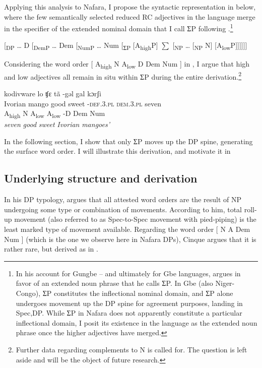 \documentclass[output=paper]{langscibook}
\begin{document}
Applying this analysis to Nafara, I propose the syntactic representation in  below, where the few semantically selected reduced RC adjectives in the language merge in the specifier of the extended nominal domain that I call ƩP following \citet{Aboh2004}.\footnote{In his account for Gungbe – and ultimately for Gbe languages, \citet{Aboh2004} argues in favor of an extended noun phrase that he calls ƩP. In Gbe (also Niger-Congo), ƩP constitutes the inflectional nominal domain, and ƩP alone undergoes movement up the DP spine for agreement purposes, landing in Spec,DP. While ƩP in Nafara does not apparently constitute a particular inflectional domain, I posit its existence in the language as the extended noun phrase once the higher adjectives have merged.}

\ea\label{ex:baron:13}
[\textsubscript{DP} … D [\textsubscript{DemP} … Dem [\textsubscript{NumP} … Num [\textsubscript{ƩP} [A\textsubscript{high}P] ${\sum}$ [\textsubscript{NP} … [\textsubscript{NP} N] [A\textsubscript{low}P]]]]]]
\z

Considering the word order [ A\textsubscript{high}  N  A\textsubscript{low}  D  Dem  Num ] in , I argue that high and low adjectives all remain in situ within ƩP during the entire derivation.\footnote{Further data regarding complements to N is called for. The question is left aside and will be the object of future research.}  


\ea\label{ex:baron:14}
\glll kodivware lo ʧɛ tã -gəl gal kɔrʃi\\
   Ivorian mango good sweet  -\textsc{def.3.pl} \textsc{dem.3.pl} seven\\
   A\textsubscript{high}   N  A\textsubscript{low}  A\textsubscript{low}  -D  Dem  Num\\
 \textit{seven} \textit{good} \textit{sweet} \textit{Ivorian} \textit{mangoes’}
\z

In the following section, I show that only ƩP moves up the DP spine, generating the surface word order. I will illustrate this derivation, and motivate it in  

 
\subsection{Underlying structure and derivation} 
\label{sec:baron:2.2}
In his DP typology, \citet{Cinque2005} argues that all attested word orders are the result of NP undergoing some type or combination of movements. According to him, total roll-up movement (also referred to as Spec-to-Spec movement with pied-piping) is the least marked type of movement available. Regarding the word order [ N A Dem Num ] (which is the one we observe here in Nafara DPs), Cinque argues that it is rather rare, but derived as in .
\end{document}
